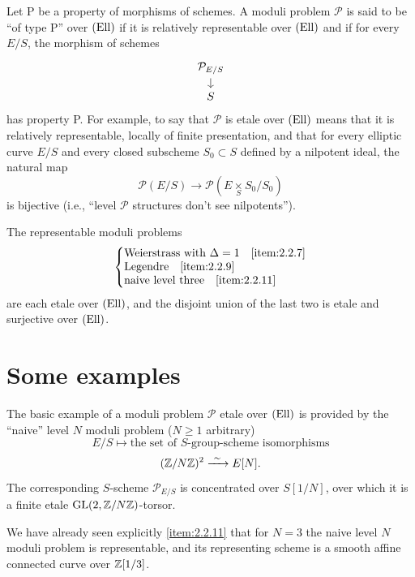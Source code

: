 Let P be a property of morphisms of schemes. A moduli problem $\mathcal{P}$ is said to be ``of type P'' over $(\mathrm{Ell})$ if it is relatively representable over $(\mathrm{Ell})$ and if for every $E/S$, the morphism of schemes
\[
\begin{tikzcd}[row sep=small, column sep=small]
\mathcal{P}_{E/S} \arrow[d] \\
S
\end{tikzcd}
\]
has property P. For example, to say that $\mathcal{P}$ is etale over $(\mathrm{Ell})$ means that it is relatively representable, locally of finite presentation, and that for every elliptic curve $E/S$ and every closed subscheme $S_0 \subset S$ defined by a nilpotent ideal, the natural map
\[
\mathcal{P}(E/S) \longrightarrow \mathcal{P}(E \underset{S}{\times} S_0/S_0)
\]
is bijective (i.e., ``level $\mathcal{P}$ structures don't see nilpotents'').

The representable moduli problems
\[
\left\{
\begin{array}{@{}l@{}}
\text{Weierstrass with } \Delta = 1 \quad \ref{item:2.2.7} \\
\text{Legendre} \quad \ref{item:2.2.9} \\
\text{naive level three} \quad \ref{item:2.2.11}
\end{array}
\right.
\]
are each etale over $(\mathrm{Ell})$, and the disjoint union of the last two is etale and surjective over $(\mathrm{Ell})$.

\section{Some examples}
\label{sec:4.6}

The basic example of a moduli problem $\mathcal{P}$ etale over $(\mathrm{Ell})$ is provided by the ``naive'' level $N$ moduli problem ($N \ge 1$ arbitrary)
\[
E/S \longmapsto \text{the set of } S\text{-group-scheme isomorphisms}
\]
\[
(\mathbb{Z}/N\mathbb{Z})^2 \xrightarrow{\ \sim\ } E[N].
\]
The corresponding $S$-scheme $\mathcal{P}_{E/S}$ is concentrated over $S[1/N]$, over which it is a finite etale $\operatorname{GL}(2, \mathbb{Z}/N\mathbb{Z})$-torsor.

\kmeqitem\label{item:4.6.1}
We have already seen explicitly \ref{item:2.2.11} that for $N = 3$ the naive level $N$ moduli problem is representable, and its representing scheme is a smooth affine connected curve over $\mathbb{Z}[1/3]$.

